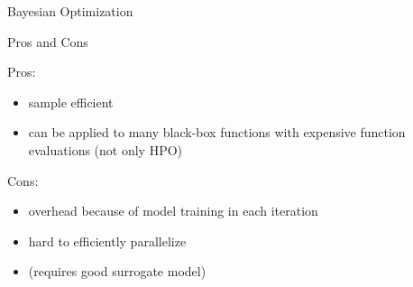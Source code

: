\begin{frame}[c,fragile]{Bayesian Optimization}

\begin{block}{Pros and Cons}

Pros:
\begin{itemize}
  \item sample efficient
  \item can be applied to many black-box functions with expensive function evaluations (not only HPO)
\end{itemize}

Cons:
\begin{itemize}
  \item overhead because of model training in each iteration
  \item hard to efficiently parallelize
  \item (requires good surrogate model)
\end{itemize}

\end{block}

\end{frame}
